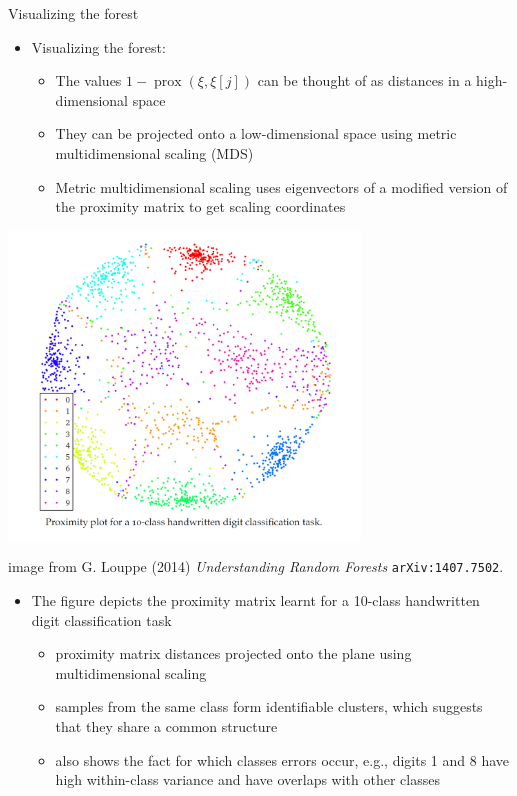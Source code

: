 \documentclass[11pt,compress,t,notes=noshow, xcolor=table]{beamer}
\begin{document}
\begin{vbframe}{Visualizing the forest}

\begin{itemize}
\item Visualizing the forest: 
  \begin{itemize}
  \item The values $1 - \operatorname{prox}\left(\xi, \xi[j]\right)$ can be thought of as distances in a high-dimensional space
  \item They can be projected onto a low-dimensional space using metric multidimensional scaling (MDS)
  \item Metric multidimensional scaling uses eigenvectors of a modified version of the proximity matrix to get scaling coordinates
  \end{itemize}
\end{itemize}

\framebreak

\begin{center}
\includegraphics[width=0.7\textwidth]{figure_man/Proximity_plot.png}
\end{center}
\tiny image from G. Louppe (2014) \emph{Understanding Random Forests} \texttt{arXiv:1407.7502}. 

\framebreak

\begin{itemize}
  \item \normalsize The figure depicts the proximity matrix learnt for a 10-class handwritten digit classification task
  \begin{itemize}
  \item proximity matrix distances projected onto the plane using multidimensional scaling
  \item samples from the same class form identifiable clusters, which suggests that they share a common structure
  \item also shows the fact for which classes errors occur, e.g.,  digits 1 and 8 have high within-class variance and have overlaps with other classes 
  \end{itemize}
\end{itemize}

\end{vbframe}
\end{document}
